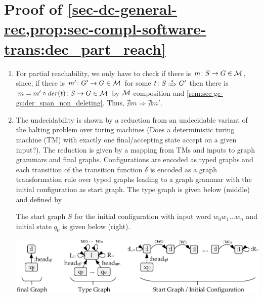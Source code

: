 \section{Proof of \cref{sec-dc-general-rec,prop:sec-compl-software-trans:dec_part_reach}}
\label{sec-proofs:prop:sec-compl-software-trans:dec_part_reach}
\begin{enumerate}
  \item For partial reachability, we only have to check if there is $m\colon S \to G \in {\cal M}$, since, if there is $m'\colon G' \to G \in {\cal M}$ for some $t\colon S \Trans{*} G'$ then there is $m=m'\circ \mathit{der}(t)\colon S \to G \in {\cal M}$ by ${\cal M}$-composition and \cref{rem:sec-gc-gc:der_span_non_deleting}.\thispagestyle{plain}
  Thus, $\nexists m \Rightarrow \nexists m'$.
  \item The undecidability is shown by a reduction from an undecidable variant of the halting problem over turing machines (Does a deterministic turing machine (TM) with exactly one final/accepting state accept on a given input?).
  The reduction is given by a mapping from TMs and inputs to graph grammars and final graphs.
  Configurations are encoded as typed graphs and each transition of the transition function $\delta$ is encoded as a graph transformation rule over typed graphs leading to a graph grammar with the initial configuration as start graph.
  The type graph is given below (middle) and defined by 
  The start graph $S$ for the initial configuration with input word $w_0w_1\ldots w_n$ and initial state $q_0$ is given below (right).
  
  \begin{center}
  \includegraphics[width=.92\textwidth]{img/software_trans/turing1.pdf}
  \end{center}
  

\end{enumerate}
